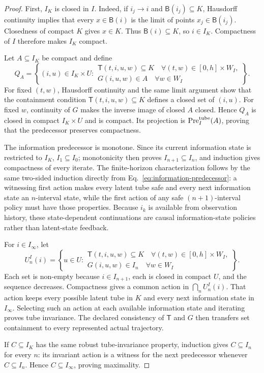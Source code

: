 \documentclass[11pt]{article}
\theoremstyle{definition}
\newcommand{\Pre}{\operatorname{Pre}}
\begin{document}
\begin{proof}
First, $I_K$ is closed in $I$. Indeed, if $i_j\to i$ and $\mathsf B(i_j)\subseteq K$, Hausdorff continuity implies that every $x\in\mathsf B(i)$ is the limit of points $x_j\in\mathsf B(i_j)$. Closedness of compact $K$ gives $x\in K$. Thus $\mathsf B(i)\subseteq K$, so $i\in I_K$. Compactness of $I$ therefore makes $I_K$ compact.

Let $A\subseteq I_K$ be compact and define
\[
Q_A=\left\{(i,u)\in I_K\times U:\begin{array}{l}
\mathsf T(t,i,u,w)\subseteq K\quad\forall(t,w)\in[0,h]\times W_I,\\
G(i,u,w)\in A\quad\forall w\in W_I
\end{array}\right\}.
\]
For fixed $(t,w)$, Hausdorff continuity and the same limit argument show that the containment condition $\mathsf T(t,i,u,w)\subseteq K$ defines a closed set of $(i,u)$. For fixed $w$, continuity of $G$ makes the inverse image of closed $A$ closed. Hence $Q_A$ is closed in compact $I_K\times U$ and is compact. Its projection is $\Pre_I^{\rm tube}(A)$, proving that the predecessor preserves compactness.

The information predecessor is monotone. Since its current information state is restricted to $I_K$, $I_1\subseteq I_0$; monotonicity then proves $I_{n+1}\subseteq I_n$, and induction gives compactness of every iterate. The finite-horizon characterization follows by the same two-sided induction directly from Eq.~\eqref{eq:information-predecessor}: a witnessing first action makes every latent tube safe and every next information state an $n$-interval state, while the first action of any safe $(n+1)$-interval policy must have those properties. Because $i_k$ is available from observation history, these state-dependent continuations are causal information-state policies rather than latent-state feedback.

For $i\in I_\infty$, let
\[
U_n^I(i)=\left\{u\in U:\begin{array}{l}
\mathsf T(t,i,u,w)\subseteq K\quad\forall(t,w)\in[0,h]\times W_I,\\
G(i,u,w)\in I_n\quad\forall w\in W_I
\end{array}\right\}.
\]
Each set is non-empty because $i\in I_{n+1}$, each is closed in compact $U$, and the sequence decreases. Compactness gives a common action in $\bigcap_nU_n^I(i)$. That action keeps every possible latent tube in $K$ and every next information state in $I_\infty$. Selecting such an action at each available information state and iterating proves tube invariance. The declared consistency of $\mathsf T$ and $G$ then transfers set containment to every represented actual trajectory.

If $C\subseteq I_K$ has the same robust tube-invariance property, induction gives $C\subseteq I_n$ for every $n$: its invariant action is a witness for the next predecessor whenever $C\subseteq I_n$. Hence $C\subseteq I_\infty$, proving maximality.
\end{proof}
\end{document}
